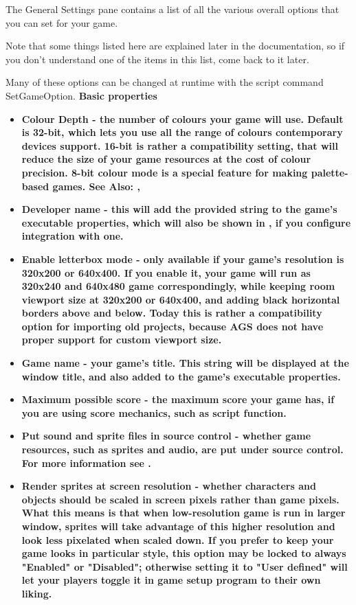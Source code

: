 The General Settings pane contains a list of all the various overall options
that you can set for your game.

Note that some things listed here are explained later in the documentation,
so if you don't understand one of the items in this list, come back to it
later.

Many of these options can be changed at runtime with the script command SetGameOption.
\bf{Basic properties}
\begin{itemize}
\item \bf{Colour Depth} - the number of colours your game will use. Default is 32-bit, which lets you use all the range of colours contemporary devices support.
16-bit is rather a compatibility setting, that will reduce the size of your game resources at the cost of colour precision.
8-bit colour mode is a special feature for making palette-based games.
See Also: ,
\item \bf{Developer name} - this will add the provided string to the game's executable properties, which will also be shown in , if you configure integration with one.
\item \bf{Enable letterbox mode} - only available if your game's resolution is 320x200 or 640x400. If you enable it, your game will run as 320x240 and 640x480 game correspondingly, while keeping room viewport size at 320x200 or 640x400, and adding black horizontal borders above and below. Today this is rather a compatibility option for importing old projects, because AGS does not have proper support for custom viewport size.
\item \bf{Game name} - your game's title. This string will be displayed at the window title, and also added to the game's executable properties.
\item \bf{Maximum possible score} - the maximum score your game has, if you are using score mechanics, such as  script function.
\item \bf{Put sound and sprite files in source control} - whether game resources, such as sprites and audio, are put under source control. For more information see .
\item \bf{Render sprites at screen resolution} - whether characters and objects should be scaled in screen pixels rather than game pixels. What this means is that when low-resolution game is run in larger window, sprites will take advantage of this higher resolution and look less pixelated when scaled down. If you prefer to keep your game looks in particular style, this option may be locked to always "Enabled" or "Disabled"; otherwise setting it to "User defined" will let your players toggle it in game setup program to their own liking.

\end{itemize}

